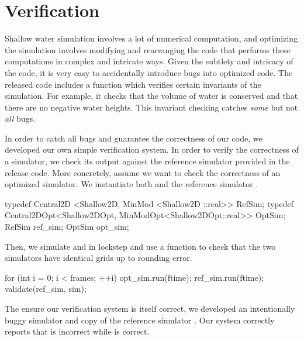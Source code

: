 \section{Verification}\label{sec:verification}
Shallow water simulation involves a lot of numerical computation, and
optimizing the simulation involves modifying and rearranging the code that
performs these computations in complex and intricate ways. Given the subtlety
and intricacy of the code, it is very easy to accidentally introduce bugs into
optimized code. The released code includes a  function
which verifies certain invariants of the simulation. For example, it checks
that the volume of water is conserved and that there are no negative water
heights. This invariant checking catches \emph{some} but not \emph{all} bugs.

In order to catch all bugs and guarantee the correctness of our code, we
developed our own simple verification system. In order to verify the
correctness of a simulator, we check its output against the reference simulator
provided in the release code. More concretely, assume we want to check the
correctness of an optimized  simulator. We instantiate both
 and the reference simulator .

\begin{CPP}
typedef Central2D   <Shallow2D,    MinMod   <Shallow2D   ::real>> RefSim;
typedef Central2DOpt<Shallow2DOpt, MinModOpt<Shallow2DOpt::real>> OptSim;
RefSim ref_sim;
OptSim opt_sim;
\end{CPP}

Then, we simulate  and  in lockstep and use a
function  to check that the two simulators have identical grids
up to rounding error.

\begin{CPP}
for (int i = 0; i < frames; ++i) {
    opt_sim.run(ftime);
    ref_sim.run(ftime);
    validate(ref_sim, sim);
}
\end{CPP}

The ensure our verification system is itself correct, we developed an
intentionally buggy  simulator and copy of the reference
simulator . Our system correctly reports that  is
incorrect while  is correct.
